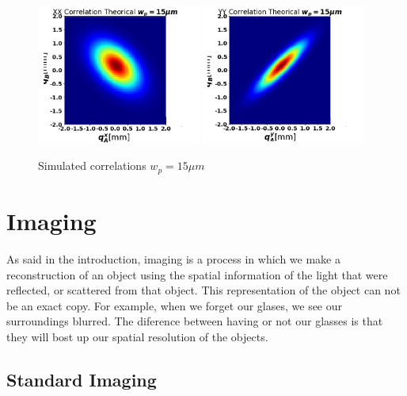 \begin{figure}[h!]
\centering
{  \includegraphics[width=0.48\textwidth]{Figures/correlationsWaistxx15.png} }
{  \includegraphics[width=0.48\textwidth]{Figures/correlationsWaistyy15.png} }
\caption{Simulated correlations $w_p=15\mu m$ }
 \label{fig:simCorrelations}
\end{figure}


\section{Imaging}
  
As said in the introduction, imaging is a process in which we make a reconstruction 
of an object using the spatial information of the light that were reflected, or scattered
from that object. This representation of the object can not be an exact copy. For example, when we forget
our glases, we see our surroundings blurred. The diference between 
having or not our glasses is that they will bost up our spatial resolution of the objects.



\subsection{Standard Imaging}


